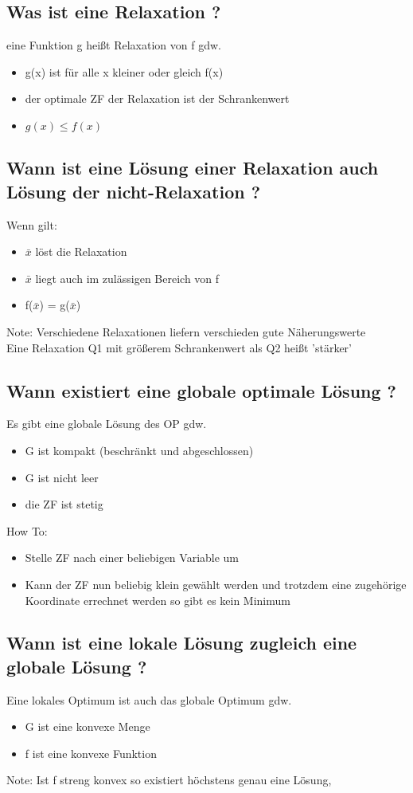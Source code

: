 \documentclass[12pt,a4paper, hyperref]{article}
\newcommand{\tbar}[1]{\ensuremath{\bar{#1}}}
\begin{document}
\subsection{Was ist eine Relaxation ?}
eine Funktion g heißt Relaxation von f gdw.
\begin{itemize}
\item g(x) ist für alle x kleiner oder gleich f(x)
\item der optimale ZF der Relaxation ist der Schrankenwert
\item $g(x) \leq f(x)$
\end{itemize}


\subsection{Wann ist eine Lösung einer Relaxation auch Lösung der nicht-Relaxation ?}
Wenn gilt:
\begin{itemize}
\item  \tbar x löst die Relaxation
\item \tbar x liegt auch im zulässigen Bereich von f
\item f(\tbar x) = g(\tbar x)
\end{itemize}
Note: Verschiedene Relaxationen liefern verschieden gute Näherungswerte\\
Eine Relaxation Q1 mit größerem Schrankenwert als Q2 heißt 'stärker'


\subsection{Wann existiert eine globale optimale Lösung ?}
Es gibt eine globale Lösung des OP gdw.
\begin{itemize}
\item G ist kompakt (beschränkt und abgeschlossen)
\item G ist nicht leer
\item die ZF ist stetig 
\end{itemize}
How To:
\begin{itemize}
\item Stelle ZF nach einer beliebigen Variable um
\item Kann der ZF nun beliebig klein gewählt werden und trotzdem eine zugehörige Koordinate errechnet werden so gibt es kein Minimum
\end{itemize}


\subsection{Wann ist eine lokale Lösung zugleich eine globale Lösung ?}
Eine lokales Optimum ist auch das globale Optimum gdw.
\begin{itemize}
\item G ist eine konvexe Menge
\item f ist eine konvexe Funktion
\end{itemize}
Note: Ist f streng konvex so existiert höchstens genau eine Lösung,
\end{document}

